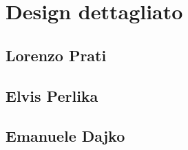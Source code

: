 \documentclass[a4paper,12pt]{report}
\begin{document}
\section{Design dettagliato}
\subsection{Lorenzo Prati}

\subsection{Elvis Perlika}

\subsection{Emanuele Dajko}
\end{document}
